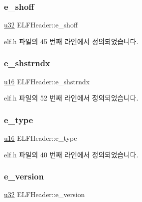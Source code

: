 \subsubsection{\texorpdfstring{e\+\_\+shoff}{e\_shoff}}
{\footnotesize\ttfamily \mbox{\hyperlink{_system_8h_a10e94b422ef0c20dcdec20d31a1f5049}{u32}} E\+L\+F\+Header\+::e\+\_\+shoff}



elf.\+h 파일의 45 번째 라인에서 정의되었습니다.

\mbox{\label{struct_e_l_f_header_a06d7be4a0c5eb3ffcf9e6adade39949c}} 
\subsubsection{\texorpdfstring{e\+\_\+shstrndx}{e\_shstrndx}}
{\footnotesize\ttfamily \mbox{\hyperlink{_system_8h_a9e6c91d77e24643b888dbd1a1a590054}{u16}} E\+L\+F\+Header\+::e\+\_\+shstrndx}



elf.\+h 파일의 52 번째 라인에서 정의되었습니다.

\mbox{\label{struct_e_l_f_header_afe37d30bff98bf36cb852b938fbc7c40}} 
\subsubsection{\texorpdfstring{e\+\_\+type}{e\_type}}
{\footnotesize\ttfamily \mbox{\hyperlink{_system_8h_a9e6c91d77e24643b888dbd1a1a590054}{u16}} E\+L\+F\+Header\+::e\+\_\+type}



elf.\+h 파일의 40 번째 라인에서 정의되었습니다.

\mbox{\label{struct_e_l_f_header_a60e61e8eaa05924bef446c706d47b492}} 
\subsubsection{\texorpdfstring{e\+\_\+version}{e\_version}}
{\footnotesize\ttfamily \mbox{\hyperlink{_system_8h_a10e94b422ef0c20dcdec20d31a1f5049}{u32}} E\+L\+F\+Header\+::e\+\_\+version}



